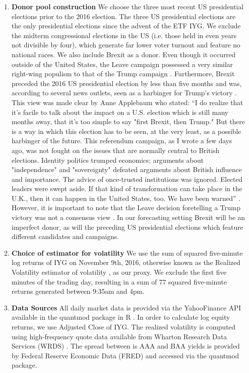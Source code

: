 \documentclass[11pt,3p,review,authoryear]{elsarticle}
\theoremstyle{definition}
\begin{document}
\begin{enumerate}
    \item \textbf{Donor pool construction} We choose the three most recent US presidential elections prior to the 2016 election.  The three US presidential elections are the only presidential elections since the advent of the ETF IYG.  We exclude the midterm congressional elections in the US (i.e. those held in even years not divisible by four), which generate far lower voter turnout and feature no national races. We also include Brexit as a donor. Even though it occurred outside of the United States, the Leave campaign possessed a very similar right-wing populism to that of the Trump campaign \citep{wilson2017brexit}. Furthermore, Brexit preceded the 2016 US presidential election by less than five months and was, according to several news outlets, seen as a harbinger for Trump's victory \citep{kay2016brexit, collins2016trump}. This view was made clear by %
    Anne Applebaum who stated: ``I do realize that it's facile to talk about the impact on a U.S. election which is still many months away, that it's too simple to say "first Brexit, then Trump." But there is a way in which this election has to be seen, at the very least, as a possible harbinger of the future. This referendum campaign, as I wrote a few days ago, was not fought on the issues that are normally central to British elections. Identity politics trumped economics; arguments about "independence" and "sovereignty" defeated arguments about British influence and importance. The advice of once-trusted institutions was ignored. Elected leaders were swept aside. If that kind of transformation can take place in the U.K., then it can happen in the United States, too. We have been warned'' \citep{applebaum2016britain}. However, it is important to note that the Leave decision foretelling a Trump victory was not a consensus view \citep{martin2016brexit, barro2016three}. In our forecasting setting Brexit will be an imperfect donor, as will the preceding US presidential elections which feature different candidates and campaigns.
    \item \textbf{Choice of estimator for volatility} We use the sum of squared five-minute log returns of IYG on November 9th, 2016, otherwise known as the Realized Volatility estimator of volatility \citep{andersen2008realized}, as our proxy.  We exclude the first five minutes of the trading day, resulting in a sum of 77 squared five-minute returns generated between 9:35am and 4pm.
    \item \textbf{Data Sources} All daily market data is provided via the YahooFinance API available in the quantmod package in R \citep{ryan2015package}.  In order to calculate log equity returns, we use Adjusted Close of IYG.  The realized volatility is computed using high-frequency quote data available from Wharton Research Data Services (WRDS) \citep{wachowicz2020wharton}.  The spread between is AAA and BAA yields is provided by Federal Reserve Economic Data (FRED) and accessed via the quantmod package.
\end{enumerate} 
\end{document}
